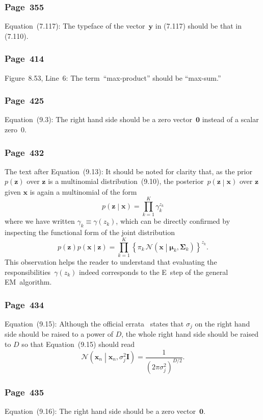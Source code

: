 \documentclass[12pt,a4paper]{article}
\newcommand{\erratum}[1]{\subsubsection*{#1}}
\begin{document}
\erratum{Page~355}
Equation~(7.117):
The typeface of the vector~$\mathbf{y}$ in (7.117) should be that in (7.110).

\erratum{Page~414}
Figure~8.53, Line~6:
The term~``max-product'' should be ``max-sum.''

\erratum{Page~425}
Equation~(9.3):
The right hand side should be a zero vector~$\mathbf{0}$ instead of a scalar zero~$0$.

\erratum{Page~432}
The text after Equation~(9.13):
It should be noted for clarity that, as the prior~$p(\mathbf{z})$ over $\mathbf{z}$ is
a multinomial distribution~(9.10),
the posterior~$p \left( \mathbf{z} \middle| \mathbf{x} \right)$ over $\mathbf{z}$
given $\mathbf{x}$ is again a multinomial of the form
\begin{equation}
p \left( \mathbf{z} \middle| \mathbf{x} \right) = \prod_{k=1}^{K} \gamma_k^{z_k}
\end{equation}
where we have written $\gamma_k \equiv \gamma(z_k)$,
which can be directly confirmed by inspecting the functional form of the joint distribution
\begin{equation}
p \left( \mathbf{z} \right) p \left( \mathbf{x} \middle| \mathbf{z} \right) =
 \prod_{k=1}^{K} \left\{ \pi_k \,
 \mathcal{N} \left( \mathbf{x} \middle| \bm{\mu}_k, \bm{\Sigma}_k \right) \right\}^{z_k} .
\end{equation}
This observation helps the reader to understand that
evaluating the responsibilities~$\gamma(z_k)$ indeed corresponds to
the E~step of the general EM~algorithm.

\erratum{Page~434}
Equation~(9.15):
Although the official errata~\citep{Svensen:PRML_errata} states that
$\sigma_j$ on the right hand side should be raised to a power of $D$,
the whole right hand side should be raised to $D$ so that Equation~(9.15) should read
\begin{equation}
\mathcal{N}\left( \mathbf{x}_n \middle| \mathbf{x}_n, \sigma_j^2 \mathbf{I} \right)
 = \frac{1}{\left( 2 \pi \sigma_j^2 \right)^{D/2}} .
\end{equation}

\erratum{Page~435}
Equation~(9.16):
The right hand side should be a zero vector~$\mathbf{0}$.
\end{document}
